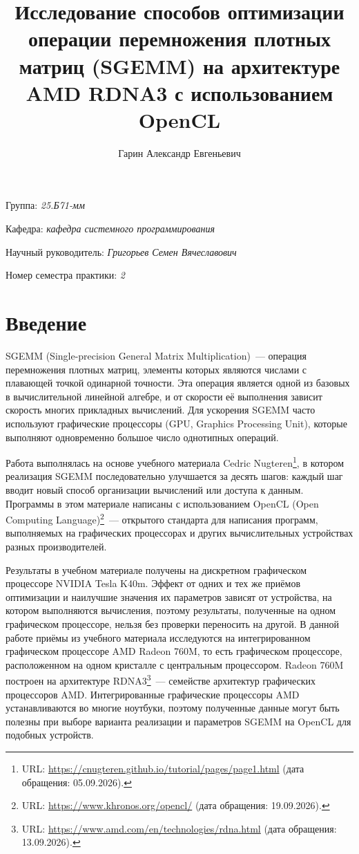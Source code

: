 \documentclass[a4paper]{article}
\title{Исследование способов оптимизации операции перемножения плотных матриц (SGEMM) на архитектуре AMD RDNA3 с использованием OpenCL}
\author{Гарин Александр Евгеньевич}
\date{}
\begin{document}
\maketitle

\begin{flushright}
    Группа: \emph{25.Б71-мм}

    Кафедра: \emph{кафедра системного программирования}

    Научный руководитель: \emph{Григорьев Семен Вячеславович}

    Номер семестра практики: \emph{2}
\end{flushright}

\section{Введение}

SGEMM (Single-precision General Matrix Multiplication)~--- операция
перемножения плотных матриц, элементы которых являются числами с
плавающей точкой одинарной точности. Эта операция является одной из
базовых в вычислительной линейной алгебре, и от скорости её выполнения
зависит скорость многих прикладных вычислений. Для ускорения SGEMM
часто используют графические процессоры (GPU, Graphics Processing
Unit), которые выполняют одновременно большое число однотипных операций.

Работа выполнялась на основе учебного материала Cedric
Nugteren\footnote{URL: \url{https://cnugteren.github.io/tutorial/pages/page1.html}
(дата обращения: 05.09.2026).}, в котором реализация SGEMM
последовательно улучшается за десять шагов: каждый шаг вводит новый
способ организации вычислений или доступа к данным. Программы в этом
материале написаны с использованием OpenCL (Open Computing
Language)\footnote{URL: \url{https://www.khronos.org/opencl/}
(дата обращения: 19.09.2026).}~--- открытого стандарта для написания
программ, выполняемых на графических процессорах и других
вычислительных устройствах разных производителей.

Результаты в учебном материале получены на дискретном графическом
процессоре NVIDIA Tesla K40m. Эффект от одних и тех же приёмов
оптимизации и наилучшие значения их параметров зависят от устройства,
на котором выполняются вычисления, поэтому результаты, полученные на
одном графическом процессоре, нельзя без проверки переносить на другой.
В данной работе приёмы из учебного материала исследуются на
интегрированном графическом процессоре AMD Radeon 760M, то есть
графическом процессоре, расположенном на одном кристалле с центральным
процессором. Radeon 760M построен на
архитектуре RDNA3\footnote{URL: \url{https://www.amd.com/en/technologies/rdna.html}
(дата обращения: 13.09.2026).}~--- семействе архитектур графических
процессоров AMD. Интегрированные графические процессоры AMD
устанавливаются во многие ноутбуки, поэтому полученные данные могут
быть полезны при выборе варианта реализации и параметров SGEMM на
OpenCL для подобных устройств.
\end{document}
